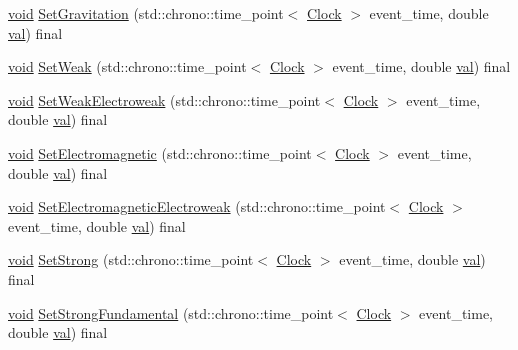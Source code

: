 \begin{DoxyCompactItemize}
\item 
\mbox{\hyperlink{glad_8h_a950fc91edb4504f62f1c577bf4727c29}{void}} \mbox{\hyperlink{class_dimension_aeec6887382d09e3d78382582ff4e7c33}{Set\+Gravitation}} (std\+::chrono\+::time\+\_\+point$<$ \mbox{\hyperlink{universe_8h_a0ef8d951d1ca5ab3cfaf7ab4c7a6fd80}{Clock}} $>$ event\+\_\+time, double \mbox{\hyperlink{glad_8h_a26942fd2ed566ef553eae82d2c109c8f}{val}}) final
\item 
\mbox{\hyperlink{glad_8h_a950fc91edb4504f62f1c577bf4727c29}{void}} \mbox{\hyperlink{class_dimension_a157cfa28dd6bc5518d622d01445ca827}{Set\+Weak}} (std\+::chrono\+::time\+\_\+point$<$ \mbox{\hyperlink{universe_8h_a0ef8d951d1ca5ab3cfaf7ab4c7a6fd80}{Clock}} $>$ event\+\_\+time, double \mbox{\hyperlink{glad_8h_a26942fd2ed566ef553eae82d2c109c8f}{val}}) final
\item 
\mbox{\hyperlink{glad_8h_a950fc91edb4504f62f1c577bf4727c29}{void}} \mbox{\hyperlink{class_dimension_a1d2accef9e6adf747f5cc143ae4527c9}{Set\+Weak\+Electroweak}} (std\+::chrono\+::time\+\_\+point$<$ \mbox{\hyperlink{universe_8h_a0ef8d951d1ca5ab3cfaf7ab4c7a6fd80}{Clock}} $>$ event\+\_\+time, double \mbox{\hyperlink{glad_8h_a26942fd2ed566ef553eae82d2c109c8f}{val}}) final
\item 
\mbox{\hyperlink{glad_8h_a950fc91edb4504f62f1c577bf4727c29}{void}} \mbox{\hyperlink{class_dimension_ad8c18ce6358904e01594092dca9f1311}{Set\+Electromagnetic}} (std\+::chrono\+::time\+\_\+point$<$ \mbox{\hyperlink{universe_8h_a0ef8d951d1ca5ab3cfaf7ab4c7a6fd80}{Clock}} $>$ event\+\_\+time, double \mbox{\hyperlink{glad_8h_a26942fd2ed566ef553eae82d2c109c8f}{val}}) final
\item 
\mbox{\hyperlink{glad_8h_a950fc91edb4504f62f1c577bf4727c29}{void}} \mbox{\hyperlink{class_dimension_aead73fc6a25388d14b514b2170735b1b}{Set\+Electromagnetic\+Electroweak}} (std\+::chrono\+::time\+\_\+point$<$ \mbox{\hyperlink{universe_8h_a0ef8d951d1ca5ab3cfaf7ab4c7a6fd80}{Clock}} $>$ event\+\_\+time, double \mbox{\hyperlink{glad_8h_a26942fd2ed566ef553eae82d2c109c8f}{val}}) final
\item 
\mbox{\hyperlink{glad_8h_a950fc91edb4504f62f1c577bf4727c29}{void}} \mbox{\hyperlink{class_dimension_ab9021cb6727ed590026bf870c638576d}{Set\+Strong}} (std\+::chrono\+::time\+\_\+point$<$ \mbox{\hyperlink{universe_8h_a0ef8d951d1ca5ab3cfaf7ab4c7a6fd80}{Clock}} $>$ event\+\_\+time, double \mbox{\hyperlink{glad_8h_a26942fd2ed566ef553eae82d2c109c8f}{val}}) final
\item 
\mbox{\hyperlink{glad_8h_a950fc91edb4504f62f1c577bf4727c29}{void}} \mbox{\hyperlink{class_dimension_a2de864aaa4b1074684395dbe928468c1}{Set\+Strong\+Fundamental}} (std\+::chrono\+::time\+\_\+point$<$ \mbox{\hyperlink{universe_8h_a0ef8d951d1ca5ab3cfaf7ab4c7a6fd80}{Clock}} $>$ event\+\_\+time, double \mbox{\hyperlink{glad_8h_a26942fd2ed566ef553eae82d2c109c8f}{val}}) final

\end{DoxyCompactItemize}

